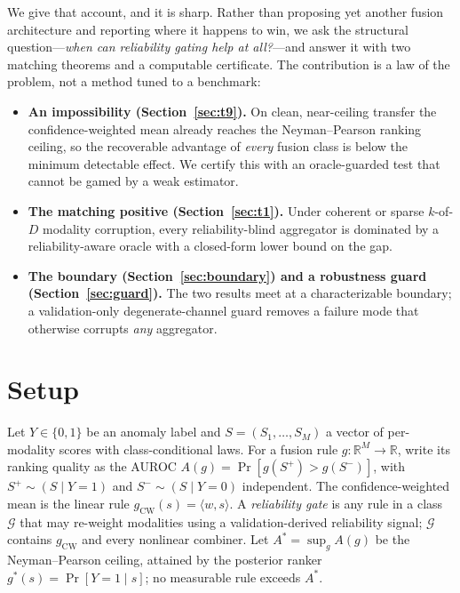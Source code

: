 \documentclass[11pt]{article}
\begin{document}
We give that account, and it is sharp. Rather than proposing yet another fusion
architecture and reporting where it happens to win, we ask the structural
question---\emph{when can reliability gating help at all?}---and answer it with two
matching theorems and a computable certificate. The contribution is a law of the
problem, not a method tuned to a benchmark:

\begin{itemize}
\item \textbf{An impossibility (Section~\ref{sec:t9}).} On clean, near-ceiling
transfer the confidence-weighted mean already reaches the Neyman--Pearson ranking
ceiling, so the recoverable advantage of \emph{every} fusion class is below the
minimum detectable effect. We certify this with an oracle-guarded test that cannot
be gamed by a weak estimator.
\item \textbf{The matching positive (Section~\ref{sec:t1}).} Under coherent or
sparse $k$-of-$D$ modality corruption, every reliability-blind aggregator is
dominated by a reliability-aware oracle with a closed-form lower bound on the gap.
\item \textbf{The boundary (Section~\ref{sec:boundary}) and a robustness guard
(Section~\ref{sec:guard}).} The two results meet at a characterizable boundary;
a validation-only degenerate-channel guard removes a failure mode that otherwise
corrupts \emph{any} aggregator.
\end{itemize}

\section{Setup}
Let $Y\in\{0,1\}$ be an anomaly label and $S=(S_1,\dots,S_M)$ a vector of
per-modality scores with class-conditional laws. For a fusion rule $g:\mathbb{R}^M
\to\mathbb{R}$, write its ranking quality as the AUROC
$A(g)=\Pr[g(S^{+})>g(S^{-})]$, with $S^{+}\sim(S\mid Y{=}1)$ and
$S^{-}\sim(S\mid Y{=}0)$ independent. The confidence-weighted mean is the linear
rule $g_{\mathrm{CW}}(s)=\langle w,s\rangle$. A \emph{reliability gate} is any rule
in a class $\mathcal{G}$ that may re-weight modalities using a validation-derived
reliability signal; $\mathcal{G}$ contains $g_{\mathrm{CW}}$ and every nonlinear
combiner. Let $A^{*}=\sup_{g}A(g)$ be the Neyman--Pearson ceiling, attained by the
posterior ranker $g^{*}(s)=\Pr[Y{=}1\mid s]$; no measurable rule exceeds $A^{*}$.
\end{document}
